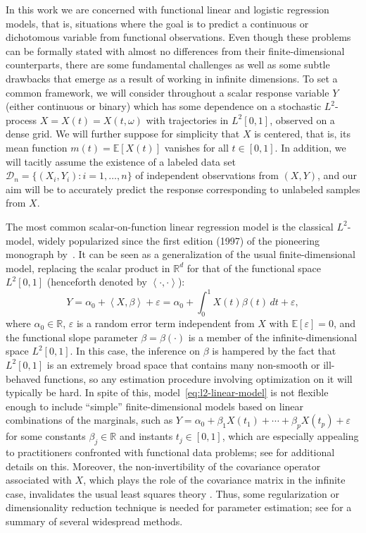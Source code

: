 \documentclass{article}
\numberwithin{equation}{section}
\theoremstyle{plain}
\theoremstyle{definition}
\renewcommand{\epsilon}{\varepsilon}
\newcommand{\R}{\mathbb{R}}
\newcommand{\E}{\mathbb{E}}
\newcommand\dotprod[2]{\left\langle#1,#2\right\rangle}
\begin{document}
In this work we are concerned with functional linear and logistic regression models, that is, situations where the goal is to predict a continuous or dichotomous variable from functional observations. Even though these problems can be formally stated with almost no differences from their finite-dimensional counterparts, there are some fundamental challenges as well as some subtle drawbacks that emerge as a result of working in infinite dimensions. To set a common framework, we will consider throughout a scalar response variable \(Y\) (either continuous or binary) which has some dependence on a stochastic \(L^2\)-process \(X=X(t)=X(t, \omega)\) with trajectories in \(L^2[0, 1]\), observed on a dense grid. We will further suppose for simplicity that \(X\) is centered, that is, its mean function \(m(t)=\E[X(t)]\) vanishes for all \(t\in[0,1]\). In addition, we will tacitly assume the existence of a labeled data set \(\mathcal D_n =\{(X_i, Y_i): i=1,\dots, n\}\) of independent observations from \((X, Y)\), and our aim will be to accurately predict the response corresponding to unlabeled samples from \(X\).

The most common scalar-on-function linear regression model is the classical \(L^2\)-model, widely popularized since the first edition (1997) of the pioneering monograph by~\citet{ramsay2005functional}. It can be seen as a generalization of the usual finite-dimensional model, replacing the scalar product in \(\R^d\) for that of the functional space \(L^2[0,1]\) (henceforth denoted by \(\dotprod{\cdot}{\cdot}\)):
\begin{equation}\label{eq:l2-linear-model}
  Y = \alpha_0 + \dotprod{X}{\beta} + \epsilon = \alpha_0 + \int_0^1 X(t)\beta(t)\, dt + \epsilon,
\end{equation}
where \(\alpha_0\in \R\), \(\epsilon\) is a random error term independent from \(X\) with \(\E [\epsilon]=0\), and the functional slope parameter \(\beta=\beta(\cdot)\) is a member of the infinite-dimensional space \(L^2[0, 1]\). In this case, the inference on \(\beta\) is hampered by the fact that \(L^2[0,1]\) is an extremely broad space that contains many non-smooth or ill-behaved functions, so any estimation procedure involving optimization on it will typically be hard. In spite of this, model~\eqref{eq:l2-linear-model} is not flexible enough to include ``simple'' finite-dimensional models based on linear combinations of the marginals, such as \(Y=\alpha_0 + \beta_1 X(t_1)+ \cdots + \beta_p X(t_p) + \epsilon\) for some constants \(\beta_j\in\R\) and instants \(t_j\in[0,1]\), which are especially appealing to practitioners confronted with functional data problems; see \citet{berrendero2024functional} for additional details on this. Moreover, the non-invertibility of the covariance operator associated with \(X\), which plays the role of the covariance matrix in the infinite case, invalidates the usual least squares theory \citep{cardot2011functional}. Thus, some regularization or dimensionality reduction technique is needed for parameter estimation; see \citet{reiss2017methods} for a summary of several widespread methods.
\end{document}
